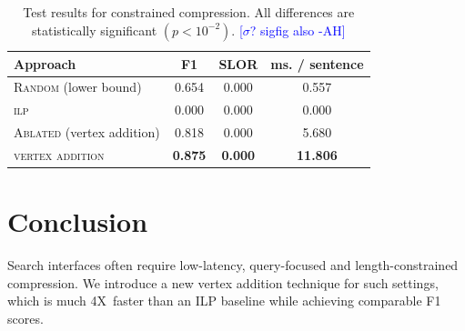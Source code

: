 \documentclass[11pt,a4paper]{article}
\newcommand{\speedup}[0]{4X~}
\newcommand{\ahcomment}[1]{\textcolor{blue}{[#1 -AH]}}
\begin{document}
\begin{table}[]
\begin{tabular}{lccc}
\centering
Approach & F1 & SLOR &  ms. / sentence  \\ \hline
\textsc{Random} {\small (lower bound) }&{\small 0.654}&{\small 0.000}&{\small 0.557}\\
\textsc{ilp}&{\small 0.000}&{\small 0.000}&{\small 0.000}\\
\textsc{Ablated}{ \small(vertex addition)} &{\small 0.818}&{\small 0.000}&{\small 5.680}\\
\textsc{vertex addition} &\textbf{\small 0.875}&\textbf{\small 0.000}&\textbf{\small 11.806}\\
\end{tabular}
\caption{Test results for constrained compression. All differences are statistically significant {\small $(p < 10^{-2})$}.
\ahcomment{$\sigma$? sigfig also}}
\label{t:results}
\end{table}

\section{Conclusion}

Search interfaces often require low-latency, query-focused and length-constrained compression. We introduce a new vertex addition technique for such settings, which is much \speedup faster than an ILP baseline while achieving comparable F1 scores. 



%



\end{document}
